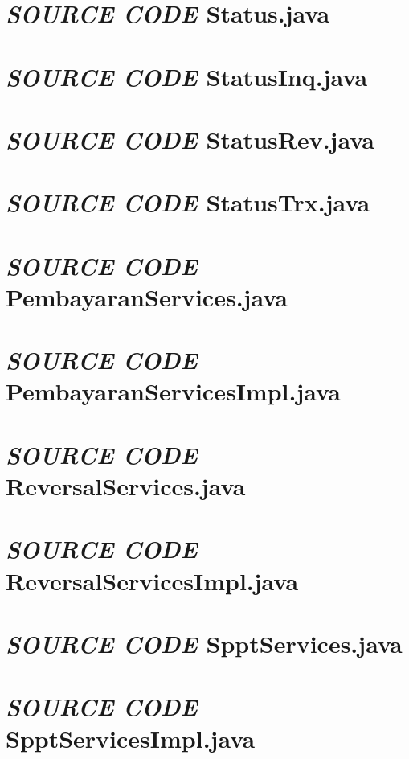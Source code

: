 \documentclass[pdftex,12pt, oneside]{article}
\begin{document}
\section{\textit{SOURCE CODE} Status.java}


\section{\textit{SOURCE CODE} StatusInq.java}


\section{\textit{SOURCE CODE} StatusRev.java}


\section{\textit{SOURCE CODE} StatusTrx.java}


\section{\textit{SOURCE CODE} PembayaranServices.java}


\section{\textit{SOURCE CODE} PembayaranServicesImpl.java}


\section{\textit{SOURCE CODE} ReversalServices.java}


\section{\textit{SOURCE CODE} ReversalServicesImpl.java}


\section{\textit{SOURCE CODE} SpptServices.java}


\section{\textit{SOURCE CODE} SpptServicesImpl.java}
\end{document}
